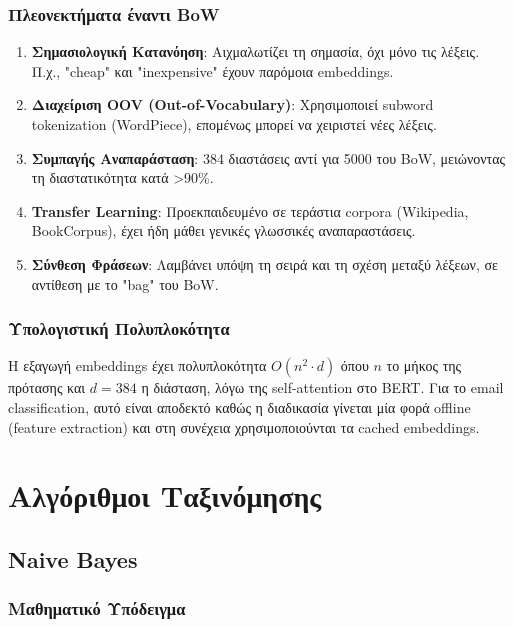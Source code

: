\documentclass[12pt,a4paper,twoside]{book}
\begin{document}
\subsubsection{Πλεονεκτήματα έναντι BoW}

\begin{enumerate}
    \item \textbf{Σημασιολογική Κατανόηση}: Αιχμαλωτίζει τη σημασία, όχι μόνο τις λέξεις. Π.χ., "cheap" και "inexpensive" έχουν παρόμοια embeddings.

    \item \textbf{Διαχείριση OOV (Out-of-Vocabulary)}: Χρησιμοποιεί subword tokenization (WordPiece), επομένως μπορεί να χειριστεί νέες λέξεις.

    \item \textbf{Συμπαγής Αναπαράσταση}: 384 διαστάσεις αντί για 5000 του BoW, μειώνοντας τη διαστατικότητα κατά >90\%.

    \item \textbf{Transfer Learning}: Προεκπαιδευμένο σε τεράστια corpora (Wikipedia, BookCorpus), έχει ήδη μάθει γενικές γλωσσικές αναπαραστάσεις.

    \item \textbf{Σύνθεση Φράσεων}: Λαμβάνει υπόψη τη σειρά και τη σχέση μεταξύ λέξεων, σε αντίθεση με το "bag" του BoW.
\end{enumerate}

\subsubsection{Υπολογιστική Πολυπλοκότητα}

Η εξαγωγή embeddings έχει πολυπλοκότητα \(O(n^2 \cdot d)\) όπου \(n\) το μήκος της πρότασης και \(d = 384\) η διάσταση, λόγω της self-attention στο BERT. Για το email classification, αυτό είναι αποδεκτό καθώς η διαδικασία γίνεται μία φορά offline (feature extraction) και στη συνέχεια χρησιμοποιούνται τα cached embeddings.

\section{Αλγόριθμοι Ταξινόμησης}

\subsection{Naive Bayes}

\subsubsection{Μαθηματικό Υπόδειγμα}
\end{document}
